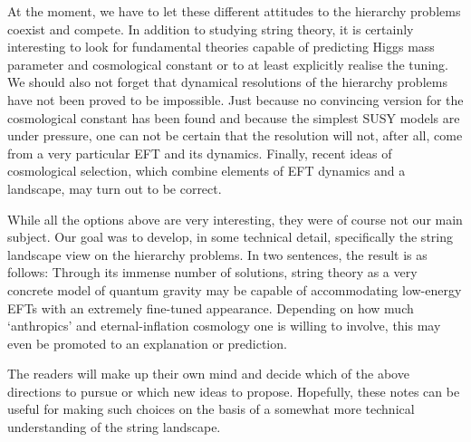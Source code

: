 \documentclass[12pt]{article}
\numberwithin{equation}{section}
\begin{document}
At the moment, we have to let these different attitudes to the hierarchy problems coexist and compete. In addition to studying string theory, it is certainly interesting to look for fundamental theories capable of predicting Higgs mass parameter and cosmological constant or to at least explicitly realise the tuning. We should also not forget that dynamical resolutions of the hierarchy problems have not been proved to be impossible. Just because no convincing version for the cosmological constant has been found and because the simplest SUSY models are under pressure, one can not be certain that the resolution will not, after all, come from a very particular EFT and its dynamics. Finally, recent ideas of cosmological selection, which combine elements of EFT dynamics and a landscape, may turn out to be correct.

While all the options above are very interesting, they were of course not our main subject. Our goal was to develop, in some technical detail, specifically the string landscape view on the hierarchy problems. In two sentences, the result is as follows: Through its immense number of solutions, string theory as  a very concrete model of quantum gravity may be capable of accommodating low-energy EFTs with an extremely fine-tuned appearance. Depending on how much `anthropics' and eternal-inflation cosmology one is willing to involve, this may even be promoted to an explanation or prediction. 

The readers will make up their own mind and decide which of the above directions to pursue or which new ideas to propose. Hopefully, these notes can be useful for making such choices on the basis of a somewhat more technical understanding of the string landscape.

\enddocument




 
\end{document}

